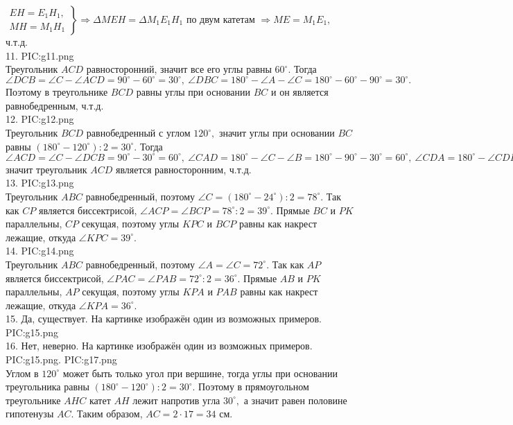 $\left.\begin{array}{l}EH=E_1H_1,\\
MH=M_1H_1  \end{array}\right\}\Rightarrow \Delta MEH=\Delta M_1E_1H_1\text{ по двум катетам }\Rightarrow ME=M_1E_1,$ ч.т.д.\\
11. {{PIC:g11.png}}\\
Треугольник $ACD$ равносторонний, значит все его углы равны $60^\circ.$ Тогда $\angle DCB=\angle C-\angle ACD=90^\circ-60^\circ=30^\circ,\ \angle DBC=180^\circ-\angle A-\angle C=180^\circ-60^\circ-90^\circ=30^\circ.$ Поэтому в треугольнике $BCD$ равны углы при основании $BC$ и он является равнобедренным, ч.т.д.\\
12. {{PIC:g12.png}}\\
Треугольник $BCD$ равнобедренный с углом $120^\circ,$ значит углы при основании $BC$ равны $(180^\circ-120^\circ):2=30^\circ.$ Тогда $\angle ACD=\angle C-\angle DCB=90^\circ-30^\circ=60^\circ,\ \angle CAD=180^\circ-\angle C-\angle B=180^\circ-90^\circ-30^\circ=60^\circ,\ \angle CDA=180^\circ-\angle CDB=180^\circ-120^\circ=60^\circ,$
значит треугольник $ACD$ является равносторонним, ч.т.д.\\
13. {{PIC:g13.png}}\\
Треугольник $ABC$ равнобедренный, поэтому $\angle C=(180^\circ-24^\circ):2=78^\circ.$ Так как $CP$ является биссектрисой, $\angle ACP=\angle BCP=78^\circ:2=39^\circ.$ Прямые $BC$ и $PK$ параллельны, $CP$ секущая, поэтому углы $KPC$ и $BCP$ равны как накрест лежащие, откуда $\angle KPC=39^\circ.$\\
14. {{PIC:g14.png}}\\
Треугольник $ABC$ равнобедренный, поэтому $\angle A=\angle C =72^\circ.$ Так как $AP$ является биссектрисой, $\angle PAC=\angle PAB=72^\circ:2=36^\circ.$ Прямые $AB$ и $PK$ параллельны, $AP$ секущая, поэтому углы $KPA$ и $PAB$ равны как накрест лежащие, откуда $\angle KPA=36^\circ.$\\
15. Да, существует. На картинке изображён один из возможных примеров.
{{PIC:g15.png}}\\
16. Нет, неверно. На картинке изображён один из возможных примеров.
{{PIC:g15.png}}\newpage{}. {{PIC:g17.png}}\\
Углом в $120^\circ$ может быть только угол при вершине, тогда углы при основании треугольника равны $(180^\circ-120^\circ):2=30^\circ.$ Поэтому в прямоугольном треугольнике $AHC$ катет $AH$ лежит напротив угла $30^\circ,$ а значит равен половине гипотенузы $AC.$ Таким образом, $AC=2\cdot17=34$ см.\\
